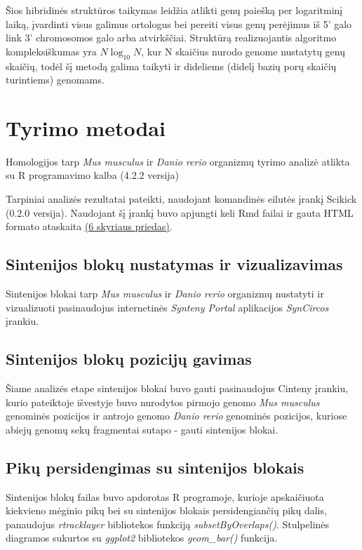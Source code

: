 \documentclass[12pt]{article}
\begin{document}
Šios hibridinės struktūros taikymas leidžia atlikti genų paiešką per logaritminį
laiką, įvardinti visus galimus ortologus bei pereiti visus genų perėjimus iš 5'
galo link 3' chromosomos galo arba atvirkščiai. Struktūrą realizuojantis
algoritmo kompleksiškumas yra $ N\log_{10}N $, kur N skaičius nurodo genome
nustatytų genų skaičių, todėl šį metodą galima taikyti ir dideliems (didelį
bazių porų skaičių turintiems) genomams.

\newpage


\section{Tyrimo metodai}
Homologijos tarp \emph{Mus musculus} ir \emph{Danio rerio} organizmų
tyrimo analizė atlikta su R programavimo kalba\cite{R} (4.2.2 versija)

Tarpiniai analizės rezultatai pateikti, naudojant komandinės eilutės įrankį
Scikick\cite{SCIK} (0.2.0 versija). Naudojant šį įrankį buvo apjungti keli Rmd
failai ir gauta HTML formato ataskaita \hyperref[Priedas]{(6 skyriaus priedas)}.

\subsection{Sintenijos blokų nustatymas ir vizualizavimas}
Sintenijos blokai tarp \emph{Mus musculus} ir \emph{Danio rerio} organizmų
nustatyti ir vizualizuoti pasinaudojus internetinės
\emph{Synteny Portal}\cite{SYN_PORT} aplikacijos \emph{SynCircos} įrankiu.

\subsection{Sintenijos blokų pozicijų gavimas}
Šiame analizės etape sintenijos blokai buvo gauti pasinaudojus Cinteny
įrankiu, kurio pateiktoje išvestyje buvo nurodytos pirmojo genomo
\emph{Mus musculus} genominės pozicijos ir antrojo genomo \emph{Danio rerio}
genominės pozicijos, kuriose abiejų genomų sekų fragmentai sutapo - gauti
sintenijos blokai.

\subsection{Pikų persidengimas su sintenijos blokais}
Sintenijos blokų failas buvo apdorotas R programoje, kurioje apskaičiuota
kiekvieno mėginio pikų bei su sintenijos blokais persidengiančių pikų dalis,
panaudojus \emph{rtracklayer}\cite{R_TRACK} bibliotekos funkciją
\emph{subsetByOverlaps()}. Stulpelinės diagramos sukurtos su
\emph{ggplot2}\cite{R_GGPLOT} bibliotekos \emph{geom\_bar()} funkcija.
\end{document}
